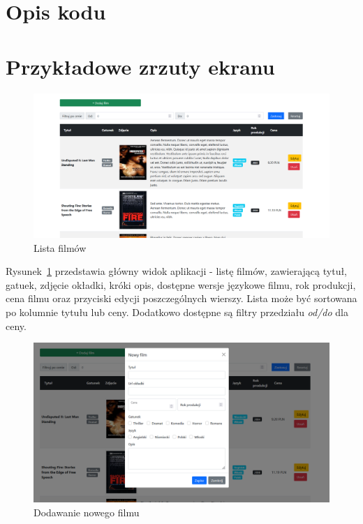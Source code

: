 \documentclass[
    12pt, %
]{fphw}
\begin{document}
    \section{Opis kodu}
    \section{Przykładowe zrzuty ekranu}
    \begin{figure}[H]
        \includegraphics[width=\linewidth]{./assets/1.PNG}
        \caption{Lista filmów}
        \label{fig:movie-list}
    \end{figure}

    Rysunek~\ref{fig:movie-list} przedstawia główny widok aplikacji - listę filmów, zawierającą tytuł,
    gatuek, zdjęcie okładki, króki opis, dostępne wersje językowe filmu, rok produkcji,
    cena filmu oraz przyciski edycji poszczególnych wierszy.
    Lista może być sortowana po kolumnie tytułu lub ceny.
    Dodatkowo dostępne są filtry przedziału \textit{od/do} dla ceny.

    \begin{figure}[H]
        \includegraphics[width=\linewidth]{./assets/2.PNG}
        \caption{Dodawanie nowego filmu}
        \label{fig:add}
    \end{figure}
\end{document}

